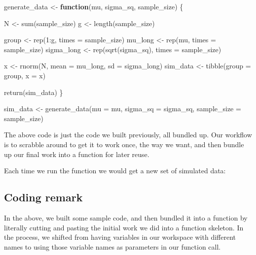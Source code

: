 \documentclass[
]{book}
\newenvironment{Shaded}{\begin{snugshade}}{\end{snugshade}}
\newcommand{\AttributeTok}[1]{\textcolor[rgb]{0.77,0.63,0.00}{#1}}
\newcommand{\ControlFlowTok}[1]{\textcolor[rgb]{0.13,0.29,0.53}{\textbf{#1}}}
\newcommand{\DecValTok}[1]{\textcolor[rgb]{0.00,0.00,0.81}{#1}}
\newcommand{\FunctionTok}[1]{\textcolor[rgb]{0.00,0.00,0.00}{#1}}
\newcommand{\NormalTok}[1]{#1}
\newcommand{\OtherTok}[1]{\textcolor[rgb]{0.56,0.35,0.01}{#1}}
\newcommand{\SpecialCharTok}[1]{\textcolor[rgb]{0.00,0.00,0.00}{#1}}
\begin{document}
\begin{Shaded}
\begin{Highlighting}[]
\NormalTok{generate\_data }\OtherTok{\textless{}{-}} \ControlFlowTok{function}\NormalTok{(mu, sigma\_sq, sample\_size) \{}

\NormalTok{  N }\OtherTok{\textless{}{-}} \FunctionTok{sum}\NormalTok{(sample\_size)}
\NormalTok{  g }\OtherTok{\textless{}{-}} \FunctionTok{length}\NormalTok{(sample\_size)}

\NormalTok{  group }\OtherTok{\textless{}{-}} \FunctionTok{rep}\NormalTok{(}\DecValTok{1}\SpecialCharTok{:}\NormalTok{g, }\AttributeTok{times =}\NormalTok{ sample\_size)}
\NormalTok{  mu\_long }\OtherTok{\textless{}{-}} \FunctionTok{rep}\NormalTok{(mu, }\AttributeTok{times =}\NormalTok{ sample\_size)}
\NormalTok{  sigma\_long }\OtherTok{\textless{}{-}} \FunctionTok{rep}\NormalTok{(}\FunctionTok{sqrt}\NormalTok{(sigma\_sq), }\AttributeTok{times =}\NormalTok{ sample\_size)}

\NormalTok{  x }\OtherTok{\textless{}{-}} \FunctionTok{rnorm}\NormalTok{(N, }\AttributeTok{mean =}\NormalTok{ mu\_long, }\AttributeTok{sd =}\NormalTok{ sigma\_long)}
\NormalTok{  sim\_data }\OtherTok{\textless{}{-}} \FunctionTok{tibble}\NormalTok{(}\AttributeTok{group =}\NormalTok{ group, }\AttributeTok{x =}\NormalTok{ x)}

  \FunctionTok{return}\NormalTok{(sim\_data)}
\NormalTok{\}}

\NormalTok{sim\_data }\OtherTok{\textless{}{-}} \FunctionTok{generate\_data}\NormalTok{(}\AttributeTok{mu =}\NormalTok{ mu, }\AttributeTok{sigma\_sq =}\NormalTok{ sigma\_sq, }
                          \AttributeTok{sample\_size =}\NormalTok{ sample\_size)}
\end{Highlighting}
\end{Shaded}

The above code is just the code we built previously, all bundled up.
Our workflow is to scrabble around to get it to work once, the way we want, and then bundle up our final work into a function for later reuse.

Each time we run the function we would get a new set of simulated data:

\hypertarget{coding-remark}{%
\subsection{Coding remark}\label{coding-remark}}

In the above, we built some sample code, and then bundled it into a function by literally cutting and pasting the initial work we did into a function skeleton.
In the process, we shifted from having variables in our workspace with different names to using those variable names as parameters in our function call.
\end{document}
